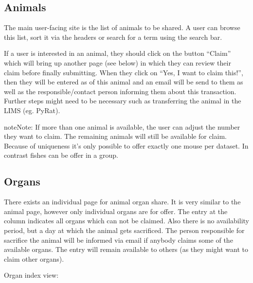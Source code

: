 \documentclass[letterpaper,10pt,openany,oneside,english]{sphinxmanual}
\begin{document}
\subsection{Animals}
\label{\detokenize{index:animals}}
The main user-facing site is the list of animals to be shared. A user can browse this list, sort it
via the headers or search for a term using the search bar.

\noindent{}

If a user is interested in an animal, they should click on the button “Claim” which will bring up
another page (see below) in which they can review their claim before finally submitting. When they
click on “Yes, I want to claim this!”, then they will be entered as  of this animal and
an email will be send to them as well as the responsible/contact person informing them about this
transaction. Further steps might need to be necessary such as transferring the animal in the LIMS
(eg. PyRat).

\begin{sphinxadmonition}{note}{Note:}
If more than one animal is available, the user can adjust the number they want to claim.
The remaining animals will still be available for claim. Because of uniqueness it’s only
possible to offer exactly one mouse per dataset. In contrast fishes can be offer in a group.
\end{sphinxadmonition}

\noindent{}


\subsection{Organs}
\label{\detokenize{index:organs}}
There exists an individual page for animal organ share. It is very similar to the animal page,
however only individual organs are for offer. The entry at the column  indicates
all organs which can not be claimed. Also there is no availability period, but a day at
which the animal gets sacrificed. The person responsible for sacrifice the animal will be informed via
email if anybody claims some of the available organs. The entry will remain available to others (as
they might want to claim other organs).

Organ index view:

\noindent{}
\end{document}
